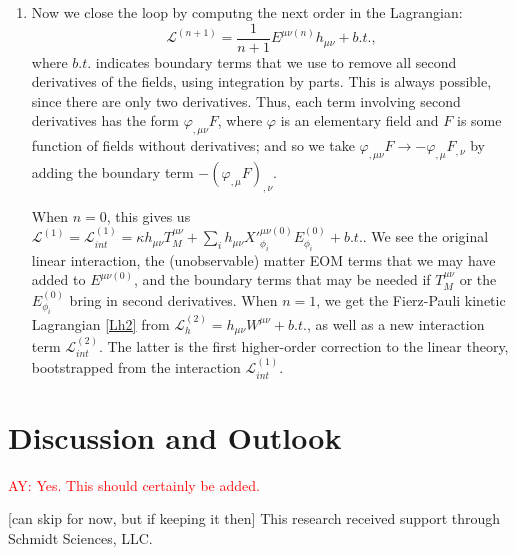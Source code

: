 \documentclass[aps,physrev,preprint,groupedaddress]{revtex4-2}
\newcommand{\AY}[1]{\textcolor{red}{AY: #1}}
\begin{document}
\begin{enumerate}
We add \(\Delta^{\mu\nu(n)}\) to the equation to get the final contribution to this order:
\begin{equation} 
E^{\mu\nu(n)}= E_4^{\mu\nu(n)}+\Psi^{\mu\nu\rho\sigma}{}_{,\rho\sigma}^{(n)}.
\end{equation}
As we have shown, if there is any valid continuation for the bootstrap, then this \(\Delta^{\mu\nu(n)}\) will indeed be identically conserved, and \(E^{\mu\nu(n)}\) will indeed satisfy all the Helmholtz conditions. 
\item Now we close the loop by computng the next order in the Lagrangian: 
\begin{equation}
\mathcal{L}^{(n+1)}=\frac{1}{n+1}E^{\mu\nu(n)}h_{\mu\nu} +b.t.,
\end{equation} 
where \(b.t.\) indicates boundary terms that we use to remove all second derivatives of the fields, using integration by parts. This is always possible, since there are only two derivatives. Thus, each term involving second derivatives has the form \( \varphi_{,\mu\nu}F\), where \(\varphi\) is an elementary field and \(F\) is some function of fields without derivatives; and so we take \(\varphi_{,\mu\nu}F\rightarrow -\varphi_{,\mu}F_{,\nu} \) by adding the boundary term \(-\left(\varphi_{,\mu}F\right)_{,\nu}\).

When \(n=0\), this gives us \(\mathcal{L}^{(1)}=\mathcal{L}_{int}^{(1)}=\kappa h_{\mu\nu}T_M^{\mu\nu}+\sum_ih_{\mu\nu}X'^{\mu\nu(0)}_{\phi_i}E_{\phi_i}^{(0)}+b.t.\). We see the original linear interaction, the (unobservable) matter EOM terms that we may have added to \(E^{\mu\nu(0)}\), and the boundary terms that may be needed if \(T_M^{\mu\nu}\) or the \(E_{\phi_i}^{(0)}\) bring in second derivatives. 
When \(n=1\), we get the Fierz-Pauli kinetic Lagrangian \eqref{Lh2} from \(\mathcal{L}_{h}^{(2)}=h_{\mu\nu}W^{\mu\nu}+b.t.\), as well as a new interaction term \(\mathcal{L}_{int}^{(2)}\). The latter is the first higher-order correction to the linear theory, bootstrapped from the interaction \(\mathcal{L}_{int}^{(1)}\).
\end{enumerate}

\section{Discussion and Outlook}

\AY{Yes. This should certainly be added.}


\begin{acknowledgments}
[can skip for now, but if keeping it then]
This research received support through Schmidt Sciences, LLC.
\end{acknowledgments}


\end{document}
